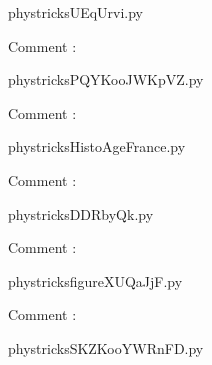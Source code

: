     \newcommand{\CaptionFigUEqUrvi}{<+Type your caption here+>}
    \begin{center}
        
    \end{center}
    phystricksUEqUrvi.py

    Comment : 

    \clearpage
    


    \newcommand{\CaptionFigPQYKooJWKpVZ}{<+Type your caption here+>}
    \begin{center}
        
    \end{center}
    phystricksPQYKooJWKpVZ.py

    Comment : 

    \clearpage
    


    \newcommand{\CaptionFigHistoAgeFrance}{<+Type your caption here+>}
    \begin{center}
        
    \end{center}
    phystricksHistoAgeFrance.py

    Comment : 

    \clearpage
    


    \newcommand{\CaptionFigDDRbyQk}{<+Type your caption here+>}
    \begin{center}
        
    \end{center}
    phystricksDDRbyQk.py

    Comment : 

    \clearpage
    


    \newcommand{\CaptionFigfigureXUQaJjF}{<+Type your caption here+>}
    \begin{center}
        
    \end{center}
    phystricksfigureXUQaJjF.py

    Comment : 

    \clearpage
    


    \newcommand{\CaptionFigSKZKooYWRnFD}{<+Type your caption here+>}
    \begin{center}
        
    \end{center}
    phystricksSKZKooYWRnFD.py


